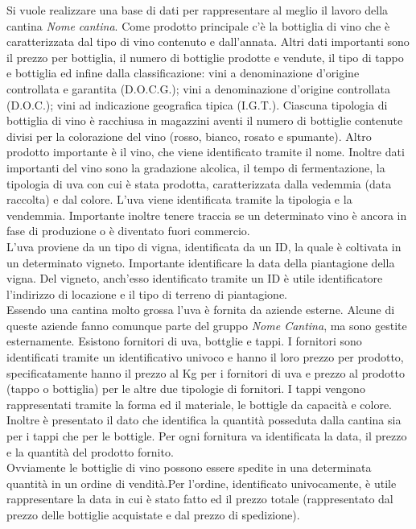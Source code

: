 Si vuole realizzare una base di dati per rappresentare al meglio il lavoro della cantina \emph{Nome cantina}. Come prodotto principale c'è la bottiglia di vino che è caratterizzata dal tipo di vino contenuto e dall'annata. Altri dati importanti sono il prezzo per bottiglia, il numero di bottiglie prodotte e vendute, il tipo di tappo e bottiglia ed infine dalla classificazione: vini a denominazione d'origine controllata e garantita (D.O.C.G.); vini a denominazione d'origine controllata (D.O.C.); vini ad indicazione geografica tipica (I.G.T.). Ciascuna tipologia di bottiglia di vino è racchiusa in magazzini aventi il numero di bottiglie contenute divisi per la colorazione del vino (rosso, bianco, rosato e spumante).
Altro prodotto importante è il vino, che viene identificato tramite il nome. Inoltre dati importanti del vino sono la gradazione alcolica, il tempo di fermentazione, la tipologia di uva con cui è stata prodotta, caratterizzata dalla vedemmia (data raccolta) e dal colore. L'uva viene identificata tramite la tipologia e la vendemmia. Importante inoltre tenere traccia se un determinato vino è ancora in fase di produzione o è diventato fuori commercio.\\
L'uva proviene da un tipo di vigna, identificata da un ID, la quale è coltivata in un determinato vigneto. Importante identificare la data della piantagione della vigna. Del vigneto, anch'esso identificato tramite un ID è utile identificatore l'indirizzo di locazione e il tipo di terreno di piantagione.\\
Essendo una cantina molto grossa l'uva è fornita da aziende esterne. Alcune di queste aziende fanno comunque parte del gruppo \emph{Nome Cantina}, ma sono gestite esternamente. Esistono fornitori di uva, bottglie e tappi.
I fornitori sono identificati tramite un identificativo univoco e hanno il loro prezzo per prodotto, specificatamente hanno il prezzo al Kg per i fornitori di uva e prezzo al prodotto (tappo o bottiglia) per le altre due tipologie di fornitori.
I tappi vengono rappresentati tramite la forma ed il materiale, le bottigle da capacità e colore. Inoltre è presentato il dato che identifica la quantità posseduta dalla cantina sia per i tappi che per le bottigle. Per ogni fornitura va identificata la data, il prezzo e la quantità del prodotto fornito.\\
Ovviamente le bottiglie di vino possono essere spedite in una determinata quantità in un ordine di vendità.Per l'ordine, identificato univocamente, è utile rappresentare la data in cui è stato fatto ed il prezzo totale (rappresentato dal prezzo delle bottiglie acquistate e dal prezzo di spedizione).\\
